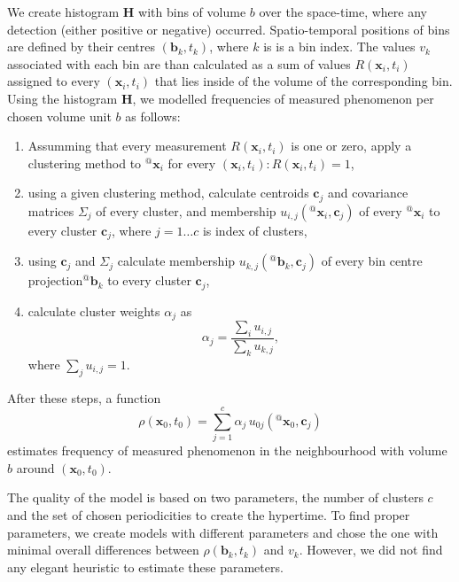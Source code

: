 We create histogram $\mathbf{H}$ with bins of volume $b$ over the space-time, where any detection (either positive or negative) occurred.
Spatio-temporal positions of bins are defined by their centres $\left(\mathbf{b}_{k}, t_{k}\right)$, where $k$ is is a bin index.
The values $v_{k}$ associated with each bin are than calculated as a sum of values $R\left(\mathbf{x}_i, t_i\right)$ assigned to every $\left(\mathbf{x}_i, t_i\right)$ that lies inside of the volume of the corresponding bin.
Using the histogram $\mathbf{H}$, we modelled frequencies of measured phenomenon per chosen volume unit $b$ as follows:
\begin{enumerate}
    \item Assumming that every measurement $R\left(\mathbf{x}_i, t_i\right)$ is one or zero,  apply a clustering method to ${}^{@}\mathbf{x}_{i}$ for every $\left(\mathbf{x}_i, t_i\right) : R\left(\mathbf{x}_i, t_i\right) = 1 $,
    \item using a given clustering method, calculate centroids $\mathbf{c}_j$ and covariance matrices $\Sigma_{j}$ of every cluster, and membership $u_{i, j}\left({}^{@}\mathbf{x}_{i}, \mathbf{c}_{j}\right)$ of every ${}^{@}\mathbf{x}_{i}$ to every cluster $\mathbf{c}_{j}$, where $j = 1\ldots c$ is index of clusters,
    \item using $\mathbf{c}_j$ and $\Sigma_{j}$ calculate membership $u_{k, j}\left({}^{@}\mathbf{b}_{k}, \mathbf{c}_{j}\right)$ of every bin centre projection${}^{@}\mathbf{b}_{k}$ to every cluster $\mathbf{c}_{j}$,
    \item calculate cluster weights $\alpha_{j}$ as
\begin{equation}\label{eqn:clusterWeights}
    \alpha_{j} = \frac{\sum_{i}u_{i, j}}{\sum_{k}u_{k, j}},
\end{equation}
where $\sum_{j}u_{i, j} = 1$.
\end{enumerate}

After these steps, a function
\begin{equation}\label{eqn:distribution}
    \rho\left(\mathbf{x}_{0},t_{0}\right) = \sum_{j=1}^{c}{\alpha_j\,u_{0j}\left({}^{@}\mathbf{x}_{0}, \mathbf{c}_{j}\right)}
\end{equation}
estimates frequency of measured phenomenon in the neighbourhood with volume $b$ around $\left(\mathbf{x}_0, t_0\right)$.
%


The quality of the model is based on two parameters, the number of clusters $c$ and the set of chosen periodicities to create the hypertime.
To find proper parameters, we create models with different parameters and chose the one with minimal overall differences between $\rho\left(\mathbf{b}_{k},t_{k}\right)$ and $v_{k}$.
However, we did not find any elegant heuristic to estimate these parameters.


